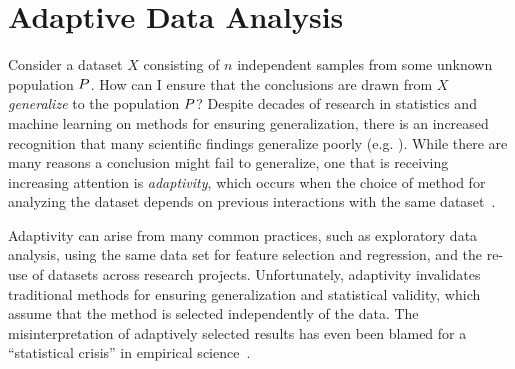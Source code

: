 \section{Adaptive Data Analysis}
\label{sec:intro-motivation}

Consider a dataset $X$ consisting of $n$ independent samples from some unknown population $P$. How can I ensure that the conclusions are drawn from $X$ \emph{generalize} to the population $P$? Despite decades of research in statistics and machine learning on methods for ensuring generalization, there is an increased recognition that many scientific findings generalize poorly (e.g. 
\cite{Ioannidis05,GelmanL13}
). While there are many reasons a conclusion might fail to generalize, one that is receiving increasing attention is \emph{adaptivity}, which occurs when the choice of method for analyzing the dataset depends on previous interactions with the same dataset~\cite{GelmanL13}.

 Adaptivity can arise from many common practices, such as exploratory data analysis, using the same data set for feature selection and regression, and the re-use of datasets across research projects. Unfortunately, adaptivity invalidates traditional methods for ensuring generalization and statistical validity, which assume that the method is selected independently of the data. The misinterpretation of adaptively selected results has even been blamed for a ``statistical crisis'' in empirical science~\cite{GelmanL13}.

